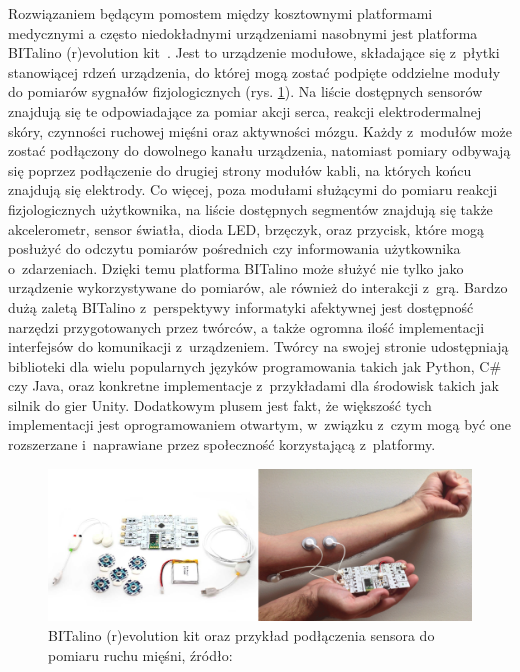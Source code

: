 Rozwiązaniem będącym pomostem między kosztownymi platformami medycznymi a często niedokładnymi urządzeniami nasobnymi jest platforma BITalino (r)evolution kit~\cite{bitalino_documentation}. Jest to urządzenie modułowe, składające się z~płytki stanowiącej rdzeń urządzenia, do której mogą zostać podpięte oddzielne moduły do pomiarów sygnałów fizjologicznych (rys. \ref{fig:bitalino}). Na liście dostępnych sensorów znajdują się te odpowiadające za pomiar akcji serca, reakcji elektrodermalnej skóry, czynności ruchowej mięśni oraz aktywności mózgu. Każdy z~modułów może zostać podłączony do dowolnego kanału urządzenia, natomiast pomiary odbywają się poprzez podłączenie do drugiej strony modułów kabli, na których końcu znajdują się elektrody. Co więcej, poza modułami służącymi do pomiaru reakcji fizjologicznych użytkownika, na liście dostępnych segmentów znajdują się także akcelerometr, sensor światła, dioda LED, brzęczyk, oraz przycisk, które mogą posłużyć do odczytu pomiarów pośrednich czy informowania użytkownika o~zdarzeniach. Dzięki temu platforma BITalino może służyć nie tylko jako urządzenie wykorzystywane do pomiarów, ale również do interakcji z~grą. Bardzo dużą zaletą BITalino z~perspektywy informatyki afektywnej jest dostępność narzędzi przygotowanych przez twórców, a także ogromna ilość implementacji interfejsów do komunikacji z~urządzeniem. Twórcy na swojej stronie udostępniają biblioteki dla wielu popularnych języków programowania takich jak Python, C\# czy Java, oraz konkretne implementacje z~przykładami dla środowisk takich jak silnik do gier Unity. Dodatkowym plusem jest fakt, że większość tych implementacji jest oprogramowaniem otwartym, w~związku z~czym mogą być one rozszerzane i~naprawiane przez społeczność korzystającą z~platformy.

\begin{figure}
	\centering
	\includegraphics[width=0.9\linewidth]{images/bitalino_emg.png}
	\caption{BITalino (r)evolution kit oraz przykład podłączenia sensora do pomiaru ruchu mięśni, źródło: \cite{neurobit_manual}}
	\label{fig:bitalino}
\end{figure}

